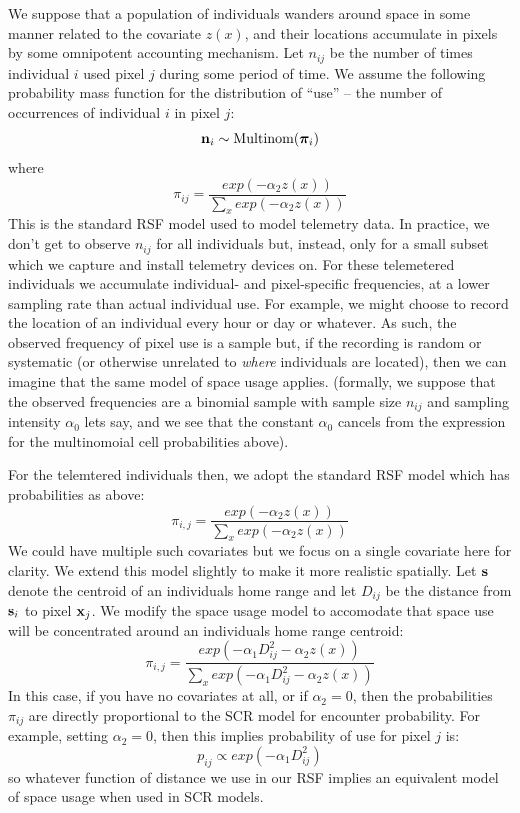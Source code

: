 We suppose that a population of individuals wanders around space in
some manner related to the covariate $z(x)$, and their locations
accumulate in pixels by some omnipotent accounting mechanism. Let
$n_{ij}$ be the number of times individual $i$ used pixel $j$ during
some period of time.  We assume the following probability mass
function for the distribution of ``use'' -- the number of occurrences
of individual $i$ in pixel $j$:
\[
{\bf n}_{i} \sim \mbox{Multinom}({\bm \pi}_{i})
\]
where
\[
 \pi_{ij} = \frac{ exp( -\alpha_{2} z(x) ) }{ \sum_{x} exp(-\alpha_{2} z(x))}
\]
This is the standard RSF model \citep{manly_etal:2002} used to model
telemetry data.  In practice, we don't get to observe $n_{ij}$ for all
individuals but, instead, only for a small subset which we capture and
install telemetry devices on.  For these telemetered individuals we
accumulate individual- and pixel-specific frequencies, at a lower
sampling rate than actual individual use. For example, we might choose
to record the location of an individual every hour or day or
whatever. As such, the observed frequency of pixel use is a sample
but, if the recording is random or systematic (or otherwise unrelated
to {\it where} individuals are located), then we can imagine that the
same model of space usage applies. (formally, we suppose that the
observed frequencies are a binomial sample with sample size $n_{ij}$
and sampling intensity $\alpha_{0}$ lets say, and we see that the
constant $\alpha_{0}$ cancels from the expression for the multinomoial
cell probabilities above).

For the telemtered individuals then,
we adopt the standard RSF
model which has probabilities as above:
\[
 \pi_{i,j} = \frac{ exp( -\alpha_{2} z(x) ) }{ \sum_{x} exp(-\alpha_{2} z(x))}
\]
We could have multiple such covariates but we focus on a
single covariate here for clarity.  We extend this model slightly to
make it more realistic spatially. Let ${\bf s}$ denote the centroid of
an individuals home range and let $D_{ij}$ be the distance from ${\bf
  s}_{i}$ to pixel ${\bf x}_{j}$. We modify the space usage model to
accomodate that space use will be concentrated
around an individuals home range centroid:
\[
 \pi_{i,j} = \frac{ exp( -\alpha_{1} D_{ij}^{2} -\alpha_{2} z(x) ) }
{ \sum_{x} exp(-\alpha_{1} D_{ij}^{2} -\alpha_{2} z(x))}
\]
In this case, if you have no covariates at all, or if $\alpha_{2} =
0$, then
the probabilities $\pi_{ij}$ are directly proportional to the SCR
model for encounter probability.
For example, setting $\alpha_{2} = 0$, then this implies probability
of use for pixel $j$ is:
\[
p_{ij} \propto  exp( -\alpha_{1} D_{ij}^{2})
\]
so whatever function of distance we use in our RSF implies an
equivalent model of space usage when used in SCR models.

